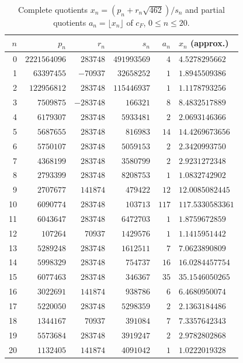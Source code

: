 \documentclass[11pt]{article}
\begin{document}
\begin{table}[h]
\centering
\small
\begin{tabular}{rrrrrl}
\toprule
$n$ & $p_n$ & $r_n$ & $s_n$ & $a_n$ & $x_n$ (approx.) \\
\midrule
0 & $2221564096$ & $283748$ & $491993569$ & $4$ & $4.5278295662$ \\
1 & $63397455$ & $-70937$ & $32658252$ & $1$ & $1.8945509386$ \\
2 & $122956812$ & $283748$ & $115446937$ & $1$ & $1.1178793256$ \\
3 & $7509875$ & $-283748$ & $166321$ & $8$ & $8.4832517889$ \\
4 & $6179307$ & $283748$ & $5933481$ & $2$ & $2.0693146366$ \\
5 & $5687655$ & $283748$ & $816983$ & $14$ & $14.4269673656$ \\
6 & $5750107$ & $283748$ & $5059153$ & $2$ & $2.3420993750$ \\
7 & $4368199$ & $283748$ & $3580799$ & $2$ & $2.9231272348$ \\
8 & $2793399$ & $283748$ & $8208753$ & $1$ & $1.0832742902$ \\
9 & $2707677$ & $141874$ & $479422$ & $12$ & $12.0085082445$ \\
10 & $6090774$ & $283748$ & $103713$ & $117$ & $117.5330583361$ \\
11 & $6043647$ & $283748$ & $6472703$ & $1$ & $1.8759672859$ \\
12 & $107264$ & $70937$ & $1429576$ & $1$ & $1.1415951442$ \\
13 & $5289248$ & $283748$ & $1612511$ & $7$ & $7.0623890809$ \\
14 & $5998329$ & $283748$ & $754737$ & $16$ & $16.0284457754$ \\
15 & $6077463$ & $283748$ & $346367$ & $35$ & $35.1546050265$ \\
16 & $3022691$ & $141874$ & $938786$ & $6$ & $6.4680950074$ \\
17 & $5220050$ & $283748$ & $5298359$ & $2$ & $2.1363184486$ \\
18 & $1344167$ & $70937$ & $391084$ & $7$ & $7.3357642343$ \\
19 & $5573684$ & $283748$ & $3919247$ & $2$ & $2.9782802868$ \\
20 & $1132405$ & $141874$ & $4091042$ & $1$ & $1.0222019328$ \\
\bottomrule
\end{tabular}
\caption{Complete quotients $x_n = (p_n + r_n\sqrt{462})/s_n$ and partial quotients $a_n = \lfloor x_n \rfloor$ of $c_F$, $0 \le n \le 20$.}
\label{tab:states}
\end{table}
\end{document}
